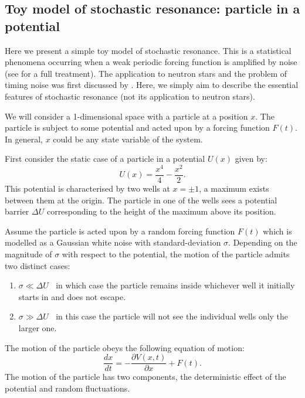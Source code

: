 \documentclass[../full_thesis/full_thesis.tex]{subfiles}
\begin{document}
\begin{subappendices}
\section{Toy model of stochastic resonance: particle in a potential}
\label{app: stochastic}

Here we present a simple toy model of stochastic resonance. This is a
statistical phenomena occurring when a weak periodic forcing function is
amplified by noise (see \citet{Jung1991} for a full treatment). The application
to neutron stars and the problem of timing noise was first discussed by
\citet{Cordes2013}. Here, we simply aim to describe the essential features of
stochastic resonance (not its application to neutron stars).

We will consider a 1-dimensional space with a particle at a position $x$. The
particle is subject to some potential and acted upon by a forcing function
$F(t)$. In general, $x$ could be any state variable of the system.
 
First consider the static case of a particle in a potential $U(x)$  given by:
\begin{equation}
    U(x) = \frac{x^{4}}{4}-\frac{x^{2}}{2}.
\end{equation}
This potential is characterised by two wells at $x=\pm1$, a maximum exists
between them at the origin. The particle in one of the wells sees a potential
barrier $\Delta U$ corresponding to the height of the maximum above its
position.

Assume the particle is acted upon by a random forcing function $F(t)$ which is
modelled as a Gaussian white noise with standard-deviation $\sigma$. Depending on the
magnitude of $\sigma$ with respect to the potential, the motion of the particle
admits two distinct cases:
\begin{enumerate}
\item $\sigma \ll \Delta U \;\;$ in which case the particle remains inside whichever
    well it initially starts in and does not escape.
\item $\sigma \gg \Delta U \;\;$ in this case the particle will not see the
    individual wells only the larger one.
\end{enumerate}

The motion of the particle obeys the following equation of motion:
\begin{equation}
    \frac{dx}{dt} = -\frac{\partial V(x,t)}{\partial x} + F(t).
\end{equation}
The motion of the particle has two components, the deterministic effect of the
potential and random fluctuations.


\end{subappendices}
\end{document}
